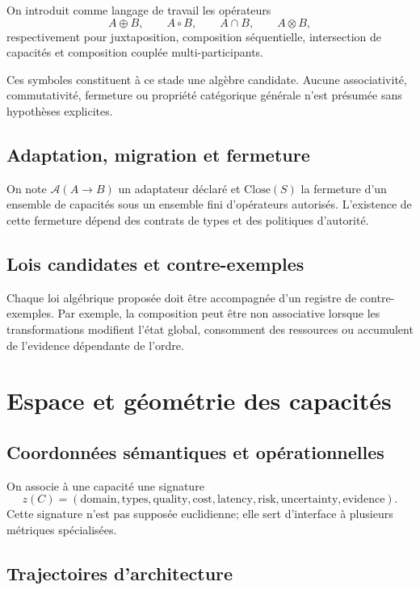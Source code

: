 On introduit comme langage de travail les opérateurs
\[
A\oplus B,\qquad A\circ B,\qquad A\cap B,\qquad A\otimes B,
\]
respectivement pour juxtaposition, composition séquentielle, intersection de capacités et composition couplée multi-participants.

\begin{limitation}
Ces symboles constituent à ce stade une algèbre candidate. Aucune associativité, commutativité, fermeture ou propriété catégorique générale n'est présumée sans hypothèses explicites.
\end{limitation}

\section{Adaptation, migration et fermeture}

On note $\mathcal A(A\to B)$ un adaptateur déclaré et $\mathrm{Close}(S)$ la fermeture d'un ensemble de capacités sous un ensemble fini d'opérateurs autorisés. L'existence de cette fermeture dépend des contrats de types et des politiques d'autorité.

\section{Lois candidates et contre-exemples}

Chaque loi algébrique proposée doit être accompagnée d'un registre de contre-exemples. Par exemple, la composition peut être non associative lorsque les transformations modifient l'état global, consomment des ressources ou accumulent de l'evidence dépendante de l'ordre.

\chapter{Espace et géométrie des capacités}

\section{Coordonnées sémantiques et opérationnelles}

On associe à une capacité une signature
\[
z(C)=(\mathrm{domain},\mathrm{types},\mathrm{quality},\mathrm{cost},\mathrm{latency},\mathrm{risk},\mathrm{uncertainty},\mathrm{evidence}).
\]
Cette signature n'est pas supposée euclidienne; elle sert d'interface à plusieurs métriques spécialisées.

\section{Trajectoires d'architecture}

